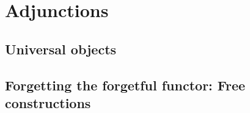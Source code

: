 
\section{Adjunctions}

\subsection{Universal objects}

\subsection{Forgetting the forgetful functor: Free constructions}